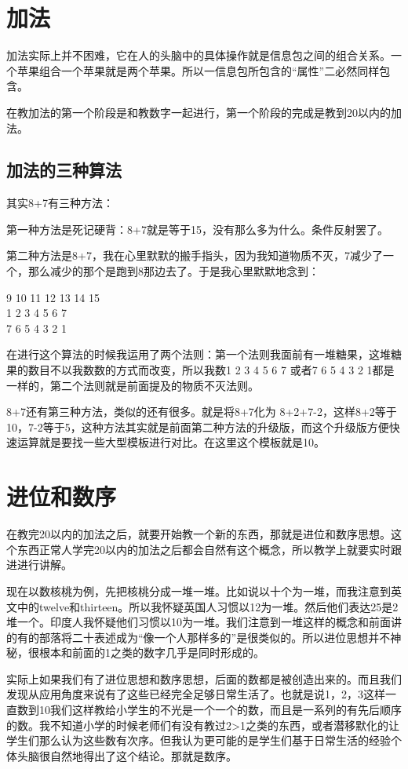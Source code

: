 \documentclass[12pt]{exam}%
\begin{document}
\section{加法}
加法实际上并不困难，它在人的头脑中的具体操作就是信息包之间的组合关系。一个苹果组合一个苹果就是两个苹果。所以一信息包所包含的“属性”二必然同样包含。

在教加法的第一个阶段是和教数字一起进行，第一个阶段的完成是教到20以内的加法。

\subsection{加法的三种算法}
其实8+7有三种方法：

第一种方法是死记硬背：8+7就是等于15，没有那么多为什么。条件反射罢了。

第二种方法是8+7，我在心里默默的搬手指头，因为我知道物质不灭，7减少了一个，那么减少的那个是跑到8那边去了。于是我心里默默地念到：

9 10 11 12 13 14 15\\
1 2   3   4   5   6  7 \\
7 6  5    4   3  2   1

在进行这个算法的时候我运用了两个法则：第一个法则我面前有一堆糖果，这堆糖果的数目不以我数数的方式而改变，所以我数1 2 3 4 5 6 7 或者7 6 5 4 3 2 1都是一样的，第二个法则就是前面提及的物质不灭法则。

8+7还有第三种方法，类似的还有很多。就是将8+7化为 8+2+7-2，这样8+2等于10，7-2等于5，这种方法其实就是前面第二种方法的升级版，而这个升级版方便快速运算就是要找一些大型模板进行对比。在这里这个模板就是10。


\section{进位和数序}
在教完20以内的加法之后，就要开始教一个新的东西，那就是进位和数序思想。这个东西正常人学完20以内的加法之后都会自然有这个概念，所以教学上就要实时跟进进行讲解。

现在以数核桃为例，先把核桃分成一堆一堆。比如说以十个为一堆，而我注意到英文中的twelve和thirteen。所以我怀疑英国人习惯以12为一堆。然后他们表达25是2堆一个。印度人我怀疑他们习惯以10为一堆。我们注意到一堆这样的概念和前面讲的有的部落将二十表述成为“像一个人那样多的”是很类似的。所以进位思想并不神秘，很根本和前面的1之类的数字几乎是同时形成的。

实际上如果我们有了进位思想和数序思想，后面的数都是被创造出来的。而且我们发现从应用角度来说有了这些已经完全足够日常生活了。也就是说1，2，3这样一直数到10我们这样教给小学生的不光是一个一个的数，而且是一系列的有先后顺序的数。我不知道小学的时候老师们有没有教过2>1之类的东西，或者潜移默化的让学生们那么认为这些数有次序。但我认为更可能的是学生们基于日常生活的经验个体头脑很自然地得出了这个结论。那就是数序。
\end{document}
